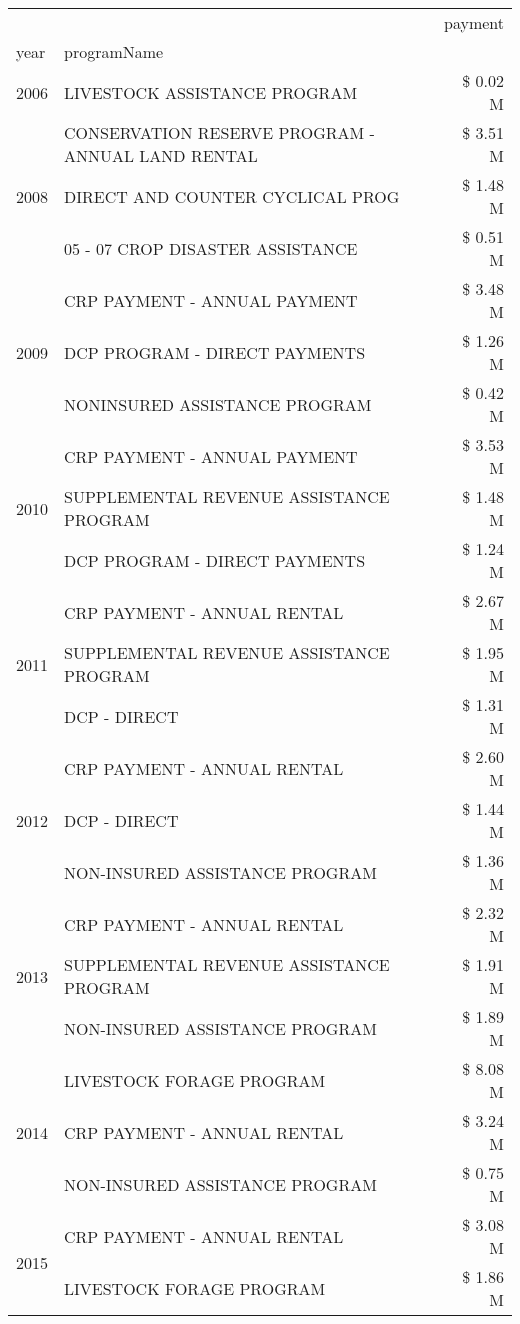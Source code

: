 \begin{tabular}{llr}
\toprule
 &  & payment \\
year & programName &  \\
\midrule
2006 & LIVESTOCK ASSISTANCE PROGRAM & \$ 0.02 M \\
\cline{1-3}
\multirow[t]{3}{*}{2008} & CONSERVATION RESERVE PROGRAM - ANNUAL LAND RENTAL & \$ 3.51 M \\
 & DIRECT AND COUNTER CYCLICAL PROG & \$ 1.48 M \\
 & 05 - 07 CROP DISASTER ASSISTANCE & \$ 0.51 M \\
\cline{1-3}
\multirow[t]{3}{*}{2009} & CRP PAYMENT - ANNUAL PAYMENT & \$ 3.48 M \\
 & DCP PROGRAM - DIRECT PAYMENTS & \$ 1.26 M \\
 & NONINSURED ASSISTANCE PROGRAM & \$ 0.42 M \\
\cline{1-3}
\multirow[t]{3}{*}{2010} & CRP PAYMENT - ANNUAL PAYMENT & \$ 3.53 M \\
 & SUPPLEMENTAL REVENUE ASSISTANCE PROGRAM & \$ 1.48 M \\
 & DCP PROGRAM - DIRECT PAYMENTS & \$ 1.24 M \\
\cline{1-3}
\multirow[t]{3}{*}{2011} & CRP PAYMENT - ANNUAL RENTAL & \$ 2.67 M \\
 & SUPPLEMENTAL REVENUE ASSISTANCE PROGRAM & \$ 1.95 M \\
 & DCP - DIRECT & \$ 1.31 M \\
\cline{1-3}
\multirow[t]{3}{*}{2012} & CRP PAYMENT - ANNUAL RENTAL & \$ 2.60 M \\
 & DCP - DIRECT & \$ 1.44 M \\
 & NON-INSURED ASSISTANCE PROGRAM & \$ 1.36 M \\
\cline{1-3}
\multirow[t]{3}{*}{2013} & CRP PAYMENT - ANNUAL RENTAL & \$ 2.32 M \\
 & SUPPLEMENTAL REVENUE ASSISTANCE PROGRAM & \$ 1.91 M \\
 & NON-INSURED ASSISTANCE PROGRAM & \$ 1.89 M \\
\cline{1-3}
\multirow[t]{3}{*}{2014} & LIVESTOCK FORAGE PROGRAM & \$ 8.08 M \\
 & CRP PAYMENT - ANNUAL RENTAL & \$ 3.24 M \\
 & NON-INSURED ASSISTANCE PROGRAM & \$ 0.75 M \\
\cline{1-3}
\multirow[t]{3}{*}{2015} & CRP PAYMENT - ANNUAL RENTAL & \$ 3.08 M \\
 & LIVESTOCK FORAGE PROGRAM & \$ 1.86 M \\

\end{tabular}
